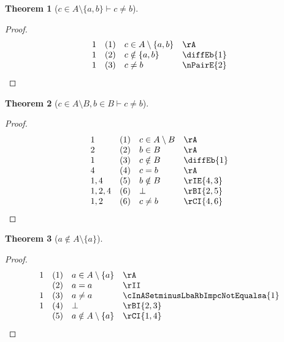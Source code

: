 \documentclass{book}
\theoremstyle{plain}
\newtheorem{theorem}{Theorem}
\theoremstyle{remark}
\theoremstyle{definition}
\begin{document}
\label{cInASetminusLbawbRbImpcNotEqualsb}
\begin{theorem}[\( c\in A\setminus\{a,b\}\vdash c\neq b \)]
\end{theorem}
\begin{proof}
    \[
	\begin{array}{llll}
		1 & (1) & c\in A\setminus\{a,b\} & \rA \\
		1 & (2) & c\notin \{a,b\} & \diffEb{1} \\
		1 & (3) & c\neq b & \nPairE{2} \\
	\end{array}
    \]
\end{proof}

\label{cInASetminusBwbInBImpcNotEqualsb}
\begin{theorem}[\( c\in A\setminus B, b\in B\vdash c\neq b \)]
\end{theorem}
\begin{proof}
    \[
	\begin{array}{llll}
		1 & (1) & c\in A\setminus B & \rA \\
		2 & (2) & b\in B & \rA \\
		1 & (3) & c\notin B & \diffEb{1} \\
		4 & (4) & c=b & \rA \\
		1,4 & (5) & b\notin B & \rIE{4,3} \\
		1,2,4 & (6) & \bot & \rBI{2,5} \\
		1,2 & (6) & c\neq b & \rCI{4,6} \\
	\end{array}
    \]
\end{proof}

\label{aNotinASetminusLbaRb}
\begin{theorem}[\(a\notin A\setminus\{a\}\)]
\end{theorem}
\begin{proof}
    \[
	\begin{array}{llll}
		1 & (1) & a\in A\setminus\{a\} & \rA \\
		& (2) & a=a & \rII \\
		1 & (3) & a\neq a & \cInASetminusLbaRbImpcNotEqualsa{1} \\
		1 & (4) & \bot & \rBI{2,3} \\
		& (5) & a\notin A\setminus\{a\} & \rCI{1,4} \\
	\end{array}
    \]
\end{proof}
\end{document}
